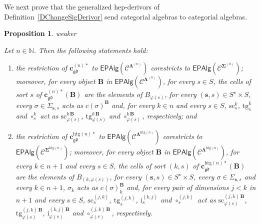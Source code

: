 \documentclass[a4paper, reqno]{amsbook}
\makeatletter
\newcommand{\sig}[1]{\mathbf{#1}}             %
\newcommand{\spec}[1]{\boldsymbol{\mathcal{#1}}} %
\newcommand{\gd}{\mathfrak{gd}}              %
\newcommand{\htg}{\mathrm{htg}}                %
\newcommand{\src}{\mathrm{sc}}
\newcommand{\tgt}{\mathrm{tg}}
\theoremstyle{plain}
\newtheorem{proposition}[theorem]{Proposition}
\theoremstyle{definition}
\newcommand*{\CA@leanpending}{}
\newcommand*{\CA@leanrelation}{}
\newcommand*{\lean}[2]{%
  \ifcsname\string\color@lean@#1\endcsname\else
    \PackageError{main}{Unknown relation `#1' in \string\lean}{Use equivalent, weaker or stronger.}%
  \fi
  \gdef\CA@leanrelation{#1}%
  \gdef\CA@leanpending{#2}}
\makeatother
\begin{document}
We next prove that the generalized hep-derivors of Definition~\ref{DChangeSigDerivor} send categorial algebras to categorial algebras.

\begin{proposition}\label{PChangeSigEpVariety}\lean{weaker}{ChangeOfSignature.homogeneous_isModel,ChangeOfSignature.heterogeneous_isModel,ChangeOfSignature.homogeneousRealization,ChangeOfSignature.heterogeneousRealization}
Let $n\in\mathbb{N}$.
Then the following statements hold:
\begin{enumerate}
\item the restriction of $\mathbf{c}^{(n)\ast}_{\gd}$ to $\mathsf{EPAlg}(\spec{C}^{\sig{\Lambda}^{(n)}})$ corestricts to $\mathsf{EPAlg}(\spec{C}^{\sig{\Sigma}^{(n)}})$; moreover, for every object $\mathbf{B}$ in $\mathsf{EPAlg}(\spec{C}^{\sig{\Lambda}^{(n)}})$, for every $s\in S$, the cells of sort $s$ of $\mathbf{c}^{(n)\ast}_{\gd}(\mathbf{B})$ are the elements of $B_{\varphi(s)}$, for every $(\mathbf{s},s)\in S^{\star}\times S$, every $\sigma\in\Sigma_{\mathbf{s},s}$ acts as $c(\sigma)^{\mathbf{B}}$ and, for every $k\in n$ and every $s\in S$, $\src^{k}_{s}$, $\tgt^{k}_{s}$ and $\circ^{k}_{s}$ act as $\src^{k\,\mathbf{B}}_{\varphi(s)}$, $\tgt^{k\,\mathbf{B}}_{\varphi(s)}$ and $\circ^{k\,\mathbf{B}}_{\varphi(s)}$, respectively; and
\item the restriction of $\mathbf{c}^{\htg(n)\ast}_{\gd}$ to $\mathsf{EPAlg}(\spec{C}^{\sig{\Lambda}^{\htg(n)}})$ corestricts to $\mathsf{EPAlg}(\spec{C}^{\sig{\Sigma}^{\htg(n)}})$; moreover, for every object $\mathbf{B}$ in $\mathsf{EPAlg}(\spec{C}^{\sig{\Lambda}^{\htg(n)}})$, for every $k\in n+1$ and every $s\in S$, the cells of sort $(k,s)$ of $\mathbf{c}^{\htg(n)\ast}_{\gd}(\mathbf{B})$ are the elements of $B_{(k,\varphi(s))}$, for every $(\mathbf{s},s)\in S^{\star}\times S$, every $\sigma\in\Sigma_{\mathbf{s},s}$ and every $k\in n+1$, $\sigma_{k}$ acts as $c(\sigma)_{k}^{\mathbf{B}}$ and, for every pair of dimensions $j<k$ in $n+1$ and every $s\in S$, $\src^{(j,k)}_{s}$, $\tgt^{(j,k)}_{s}$, $\mathrm{i}^{(k,j)}_{s}$ and $\circ^{(j,k)}_{s}$ act as $\src^{(j,k)\,\mathbf{B}}_{\varphi(s)}$, $\tgt^{(j,k)\,\mathbf{B}}_{\varphi(s)}$, $\mathrm{i}^{(k,j)\,\mathbf{B}}_{\varphi(s)}$ and $\circ^{(j,k)\,\mathbf{B}}_{\varphi(s)}$, respectively.
\end{enumerate}
\end{proposition}
\end{document}
